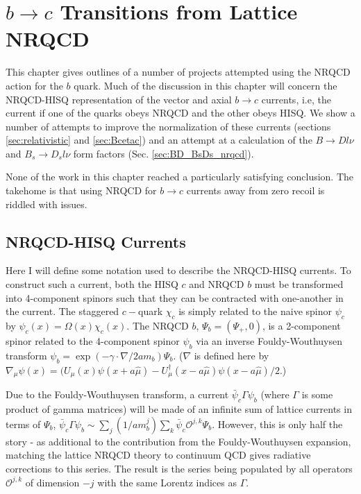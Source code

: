 ﻿\chapter{$b\to c$ Transitions from Lattice NRQCD}
\label{chap:nrqcd}

This chapter gives outlines of a number of projects attempted using the NRQCD action for the $b$ quark. Much of the discussion in this chapter will concern the NRQCD-HISQ representation of the vector and axial $b\to c$ currents, i.e, the current if one of the quarks obeys NRQCD and the other obeys HISQ. We show a number of attempts to improve the normalization of these currents (sections \ref{sec:relativistic} and \ref{sec:Bcetac}) and an attempt at a calculation of the $B\to Dl\nu$ and $B_s\to D_s l\nu$ form factors (Sec. \ref{sec:BD_BsDs_nrqcd}).

None of the work in this chapter reached a particularly satisfying conclusion. The takehome is that using NRQCD for $b \to c$ currents away from zero recoil is riddled with issues.

\section{NRQCD-HISQ Currents}

Here I will define some notation used to describe the NRQCD-HISQ currents. To construct such a current, both the HISQ $c$ and NRQCD $b$ must be transformed into 4-component spinors such that they can be contracted with one-another in the current. The staggered $c-$quark $\chi_c$ is simply related to the naive spinor $\psi_c$ by $\psi_c(x)=\Omega(x) \chi_c(x)$. The NRQCD $b$, $\Psi_{b} = ( \Psi_+, 0 )$, is a 2-component spinor related to the 4-component spinor $\psi_b$ via an inverse Fouldy-Wouthuysen transform $\psi_b = \exp( - \gamma\cdot \nabla / 2am_b )\Psi_b$. ($\nabla$ is defined here by $\nabla_{\mu} \psi(x) = (U_{\mu}(x)\psi(x+a\hat{\mu})-U^{\dagger}_{\mu}(x-a\hat{\mu})\psi(x-a\hat{\mu})/2$.)

Due to the Fouldy-Wouthuysen transform, a current $\bar{\psi}_c \Gamma \psi_b$ (where $\Gamma$ is some product of gamma matrices) will be made of an infinite sum of lattice currents in terms of $\Psi_b$, $\bar{\psi}_c \Gamma \psi_b \sim \sum_j (1/am_b^j) \sum_k \bar{\psi}_c \mathcal{O}^{j,k} \Psi_b$. However, this is only half the story - as additional to the contribution from the Fouldy-Wouthuysen expansion, matching the lattice NRQCD theory to continuum QCD gives radiative corrections to this series. The result is the series being populated by all operators $\mathcal{O}^{j,k}$ of dimension $-j$ with the same Lorentz indices as $\Gamma$. 


